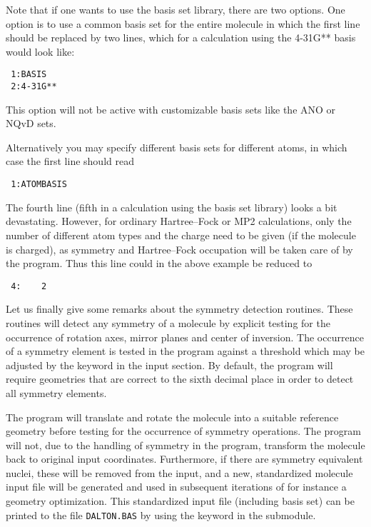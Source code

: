 Note that if one wants to use the basis set
library, there are two
options. One option is to use a common basis set for the entire
molecule in which the first line should be replaced by two lines,
which for a calculation using the 4-31G** basis would look like:
\begin{verbatim}
 1:BASIS
 2:4-31G**
\end{verbatim}
This option will not be active with customizable basis sets like the
ANO or NQvD sets.


Alternatively you may specify different basis sets for different
atoms, in which case the first line should read
\begin{verbatim}
 1:ATOMBASIS
\end{verbatim}

The fourth line (fifth in a calculation using the basis set library)
looks a bit devastating. However, for ordinary
Hartree--Fock
or MP2 calculations, only the number of different atom types and the charge
need to be given (if the molecule is charged), as symmetry and
Hartree--Fock occupation
will be taken care of by the program. Thus
this line could in the above example be reduced to
\begin{verbatim}
 4:    2
\end{verbatim}

Let us finally give some remarks about the symmetry
detection
routines. These routines will detect any symmetry of a molecule
by explicit testing for the occurrence of rotation axes, mirror planes
and center of inversion. The occurrence of a symmetry element is
tested in the program against a threshold which may be adjusted by the
keyword  in the  input section. By default,
the program will require
geometries that are correct to the sixth decimal place in order to
detect all symmetry elements.

The program will translate and rotate the molecule into a suitable
reference geometry before testing for the occurrence of symmetry
operations. The program will not, due to the handling of symmetry
in the program, transform  the molecule back to original input
coordinates. Furthermore, if there are symmetry equivalent nuclei,
these will be removed from the input, and a new, standardized
molecule input file will be generated and used in subsequent
iterations of for instance a geometry optimization. This
standardized input file (including basis set) can be printed to
the file \verb|DALTON.BAS| by using the keyword  in
the  submodule.

